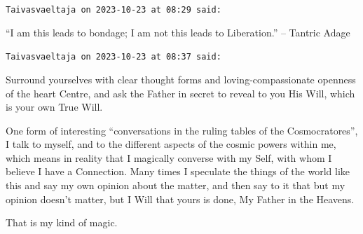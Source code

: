 \begin{footnotesize}
\begin{sffamily}
\texttt{Taivasvaeltaja on 2023-10-23 at 08:29 said:}

``I am this leads to bondage; I am not this leads to Liberation.'' -- Tantric Adage

\hfill

\texttt{Taivasvaeltaja on 2023-10-23 at 08:37 said:}

Surround yourselves with clear thought forms and loving-compassionate openness of the heart Centre, and ask the Father in secret to reveal to you His Will, which is your own True Will.

One form of interesting ``conversations in the ruling tables of the Cosmocratores'', I talk to myself, and to the different aspects of the cosmic powers within me, which means in reality that I magically converse with my Self, with whom I believe I have a Connection. Many times I speculate the things of the world like this and say my own opinion about the matter, and then say to it that but my opinion doesn't matter, but I Will that yours is done, My Father in the Heavens.

That is my kind of magic.


\hfill

\end{sffamily}
\end{footnotesize}

